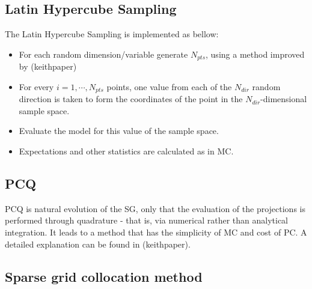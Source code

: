 \documentclass{article}
\begin{document}
\subsection{Latin Hypercube Sampling}
The Latin Hypercube Sampling is implemented as bellow:
\begin{itemize}
\item For each random dimension/variable generate $N_{pts}$, using a method improved by (keithpaper)
\item For every $i=1,\cdots,N_{pts}$ points, one value from each of the $N_{dir}$ random direction is taken
to form the coordinates of the point in the $N_{dir}$-dimensional sample space.
\item Evaluate the model for this value of the sample space.
\item Expectations and other statistics are calculated as in MC. 
\end{itemize}

\subsection{PCQ}
PCQ is natural evolution of the SG, only that the evaluation of the projections is performed 
through quadrature - that is, via numerical rather than analytical integration. 
It leads to a method that has the simplicity of MC and cost of PC. A detailed explanation
can be found in (keithpaper).

\subsection{Sparse grid collocation method}
\end{document}
